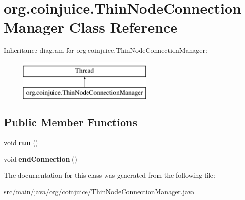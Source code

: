 \hypertarget{classorg_1_1coinjuice_1_1_thin_node_connection_manager}{\section{org.\-coinjuice.\-Thin\-Node\-Connection\-Manager Class Reference}
\label{classorg_1_1coinjuice_1_1_thin_node_connection_manager}
}
Inheritance diagram for org.\-coinjuice.\-Thin\-Node\-Connection\-Manager\-:\begin{figure}[H]
\begin{center}
\leavevmode
\includegraphics[height=2.000000cm]{classorg_1_1coinjuice_1_1_thin_node_connection_manager}
\end{center}
\end{figure}
\subsection*{Public Member Functions}
\begin{DoxyCompactItemize}
\item 
\hypertarget{classorg_1_1coinjuice_1_1_thin_node_connection_manager_acc4c24e44118578b46580182244eda99}{void {\bfseries run} ()}\label{classorg_1_1coinjuice_1_1_thin_node_connection_manager_acc4c24e44118578b46580182244eda99}

\item 
\hypertarget{classorg_1_1coinjuice_1_1_thin_node_connection_manager_a88e62105894a0c446d0f5d5c8057c126}{void {\bfseries end\-Connection} ()}\label{classorg_1_1coinjuice_1_1_thin_node_connection_manager_a88e62105894a0c446d0f5d5c8057c126}

\end{DoxyCompactItemize}


The documentation for this class was generated from the following file\-:\begin{DoxyCompactItemize}
\item 
src/main/java/org/coinjuice/Thin\-Node\-Connection\-Manager.\-java\end{DoxyCompactItemize}
